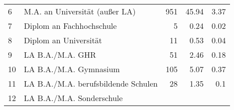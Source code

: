 \begin{longtable}{lXrrr}
     6 &
     \multicolumn{1}{X}{ M.A. an Universität (außer LA)   } &


       \num{951} &
       \num[round-mode=places,round-precision=2]{45.94} &
         \num[round-mode=places,round-precision=2]{3.37} \\

     7 &
     \multicolumn{1}{X}{ Diplom an Fachhochschule   } &


       \num{5} &
       \num[round-mode=places,round-precision=2]{0.24} &
         \num[round-mode=places,round-precision=2]{0.02} \\

     8 &
     \multicolumn{1}{X}{ Diplom an Universität   } &


       \num{11} &
       \num[round-mode=places,round-precision=2]{0.53} &
         \num[round-mode=places,round-precision=2]{0.04} \\

     9 &
     \multicolumn{1}{X}{ LA B.A./M.A. GHR   } &


       \num{51} &
       \num[round-mode=places,round-precision=2]{2.46} &
         \num[round-mode=places,round-precision=2]{0.18} \\

     10 &
     \multicolumn{1}{X}{ LA B.A./M.A. Gymnasium   } &


       \num{105} &
       \num[round-mode=places,round-precision=2]{5.07} &
         \num[round-mode=places,round-precision=2]{0.37} \\

     11 &
     \multicolumn{1}{X}{ LA B.A./M.A. berufsbildende Schulen   } &


       \num{28} &
       \num[round-mode=places,round-precision=2]{1.35} &
         \num[round-mode=places,round-precision=2]{0.1} \\

     12 &
     \multicolumn{1}{X}{ LA B.A./M.A. Sonderschule   } &



\end{longtable}
